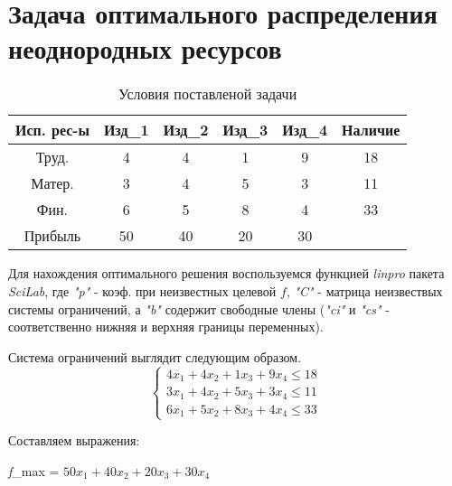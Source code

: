 \documentclass[russian,utf8,nocolumnxxxi,nocolumnxxxii]{eskdtext}
\begin{document}
\maketitle
\newpage
    \section{Задача оптимального распределения неоднородных ресурсов}
    \begin{table}[h]
        \centering
     \caption{Условия поставленой задачи}
\begin{tabular}[c]{|*{6}{c|}}
\hline
Исп. рес-ы & Изд_1 & Изд_2 & Изд_3 & Изд_4 & Наличие\\
\hline
Труд. & 4 & 4 & 1 & 9 & 18\\
\hline
Матер. & 3 & 4 & 5 & 3 & 11\\
\hline
Фин. & 6 & 5 & 8 & 4 & 33\\
\hline
Прибыль & 50 & 40 & 20 & 30\\
\hline
\end{tabular}
\end{table}

Для нахождения оптимального решения воспользуемся функцией \textit{linpro} пакета \textit{SciLab}, где \textit{"p"} - коэф. при неизвестных целевой $f$, \textit{"C"} - матрица неизвествых системы ограничений, а \textit{"b"} содержит свободные члены (\textit {"ci"} и \textit{"cs"} - соответственно нижняя и верхняя границы переменных).

 \vspace{20pt}
 
Система ограничений выглядит следующим образом.
\begin{equation*}
\begin{cases}
  4x_1+4x_2+1x_3+9x_4 \leqslant 18
   \\
  3x_1+4x_2+5x_3+3x_4 \leqslant 11
   \\
  6x_1+5x_2+8x_3+4x_4 \leqslant 33
  \end{cases}
\end{equation*}

\vspace{20pt}

Составляем выражения:

\vspace{20pt}
  
   \textit{f}_{max} = $50x_1+40x_2+20x_3+30x_4$
   
   \vspace{20pt}
   
\end{document}
